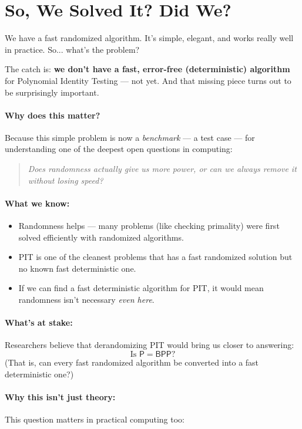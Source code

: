 \section{So, We Solved It? Did We?}

We have a fast randomized algorithm. It’s simple, elegant, and works really well in practice. So... what’s the problem?

The catch is: \textbf{we don’t have a fast, error-free (deterministic) algorithm} for Polynomial Identity Testing — not yet. And that missing piece turns out to be surprisingly important.

\paragraph{Why does this matter?}
Because this simple problem is now a \textit{benchmark} — a test case — for understanding one of the deepest open questions in computing:

\begin{quote}
\textit{Does randomness actually give us more power, or can we always remove it without losing speed?}
\end{quote}

\paragraph{What we know:}
\begin{itemize}
  \item Randomness helps — many problems (like checking primality) were first solved efficiently with randomized algorithms.
  \item PIT is one of the cleanest problems that has a fast randomized solution but no known fast deterministic one.
  \item If we can find a fast deterministic algorithm for PIT, it would mean randomness isn’t necessary \textit{even here}.
\end{itemize}

\paragraph{What’s at stake:}
Researchers believe that derandomizing PIT would bring us closer to answering:
\[
\text{Is } \mathsf{P} = \mathsf{BPP}?
\]
(That is, can every fast randomized algorithm be converted into a fast deterministic one?)

\paragraph{Why this isn’t just theory:}
This question matters in practical computing too:

